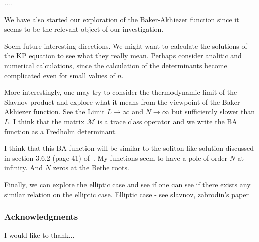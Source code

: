 \documentclass[a4paper,12pt]{amsart}
\begin{document}
.... 

We have also started our exploration of the Baker-Akhiezer function since it seems to
be the relevant object of our investigation.  

Soem future interesting directions. We might want to calculate the
solutions of the KP equation to see what they really mean. Perhaps
consider analitic and numerical calculations, since the calculation of
the determinants become complicated even for small values of \(n\).

More interestingly, one may try to consider the thermodynamic limit of
the Slavnov product and explore what it means from the viewpoint of
the Baker-Akhiezer function.  See the Limit \(L \to \infty\) and \(N
\to \infty\) but sufficiently slower than \(L\).  I think that the
matrix \(\mathcal{M}\) is a trace class operator and we write the BA
function as a Fredholm determinant.

I think that this BA function will be similar to the soliton-like
solution discussed in section 3.6.2 (page 41) of~\cite{Zabrodin2018}.
My functions seem to have a pole of order \(N\) at infinity. And \(N\)
zeros at the Bethe roots.

Finally, we can explore the elliptic case and see if one can see if
there exists any similar relation on the elliptic case.  Elliptic case
- see slavnov, zabrodin's paper



\subsubsection*{Acknowledgments}
I would like to thank...

\printbibliography
\end{document}
